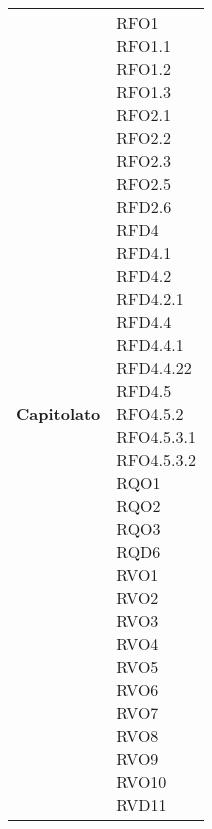 \begin{longtable}[H]{| >{\centering\bfseries}p{8cm} | >{\centering\arraybackslash}p{8cm} |}
    Capitolato &
        \makecell{
            \rule{0pt}{4ex}
            RFO1 \\
            RFO1.1 \\
            RFO1.2 \\
            RFO1.3 \\
            RFO2.1 \\
            RFO2.2 \\
            RFO2.3 \\
            RFO2.5 \\
            RFD2.6 \\
            RFD4 \\
            RFD4.1 \\
            RFD4.2 \\
            RFD4.2.1 \\
            RFD4.4 \\
            RFD4.4.1 \\
            RFD4.4.22 \\
            RFD4.5 \\
            RFO4.5.2 \\
            RFO4.5.3.1 \\
            RFO4.5.3.2 \\
            RQO1 \\
            RQO2 \\
            RQO3 \\
            RQD6 \\
            RVO1 \\
            RVO2 \\
            RVO3 \\
            RVO4 \\
            RVO5 \\
            RVO6 \\
            RVO7 \\
            RVO8 \\
            RVO9 \\
            RVO10 \\
            RVD11 \\
            \rule{0pt}{4ex}
        } \\


\end{longtable}
